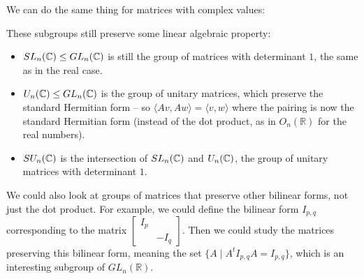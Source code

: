 We can do the same thing for matrices with complex values:
\begin{center}
\end{center}
These subgroups still preserve some linear algebraic property:
\begin{itemize}
    \item $SL_n(\mathbb C) \leq GL_n(\mathbb C)$ is still the group of matrices with determinant $1$, the same as in the real case. 
    \item $U_n(\mathbb C) \leq GL_n(\mathbb C)$ is the group of unitary matrices, which preserve the standard Hermitian form -- so $\langle Av, Aw\rangle = \langle v, w\rangle$ where the pairing is now the standard Hermitian form (instead of the dot product, as in $O_n(\mathbb{R})$ for the real numbers).  
    \item $SU_n(\mathbb C)$ is the intersection of $SL_n(\mathbb C)$ and $U_n(\mathbb C)$, the group of unitary matrices with determinant $1$.
\end{itemize}
We could also look at groups of matrices that preserve other bilinear forms, not just the dot product. For example, we could define the bilinear form $I_{p,q}$ corresponding to the matrix $\begin{bmatrix} I_p & \\ & -I_q \end{bmatrix}$. 
Then we could study the matrices preserving this bilinear form, meaning the set $\{A \mid A^t I_{p,q} A = I_{p, q}\}$, which is an interesting subgroup of $GL_n(\mathbb{R})$. 

